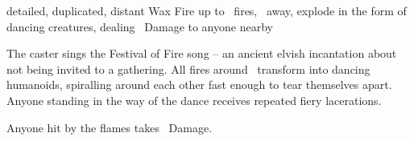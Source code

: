   {detailed, duplicated, distant}%
  {Wax}%
  {Fire}%
  {}%
  {up to \spellArea\ fires, \spellRange\ away, explode in the form of dancing creatures, dealing \rollConv\ Damage to anyone nearby}%
  {
    The caster sings the Festival of Fire song -- an ancient elvish incantation about not being invited to a gathering.
    All fires around \spellRange\ transform into dancing humanoids, spiralling around each other fast enough to tear themselves apart.
    Anyone standing in the way of the dance receives repeated fiery lacerations.

    Anyone hit by the flames takes \rollConv\ Damage.
  }

